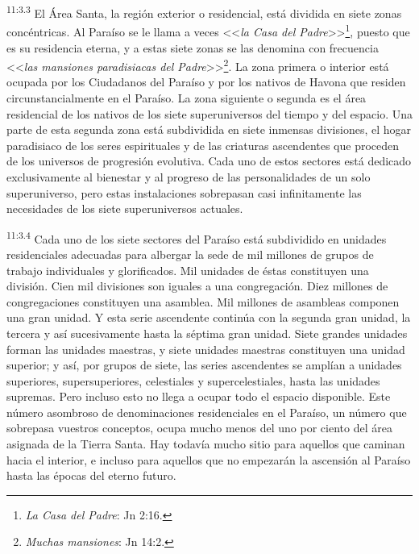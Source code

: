 \par
\textsuperscript{11:3.3} El Área Santa, la región exterior o residencial, está dividida en siete zonas concéntricas. Al Paraíso se le llama a veces <<\textit{la Casa del Padre}>>\footnote{\textit{La Casa del Padre}: Jn 2:16.}, puesto que es su residencia eterna, y a estas siete zonas se las denomina con frecuencia <<\textit{las mansiones paradisiacas del Padre}>>\footnote{\textit{Muchas mansiones}: Jn 14:2.}. La zona primera o interior está ocupada por los Ciudadanos del Paraíso y por los nativos de Havona que residen circunstancialmente en el Paraíso. La zona siguiente o segunda es el área residencial de los nativos de los siete superuniversos del tiempo y del espacio. Una parte de esta segunda zona está subdividida en siete inmensas divisiones, el hogar paradisiaco de los seres espirituales y de las criaturas ascendentes que proceden de los universos de progresión evolutiva. Cada uno de estos sectores está dedicado exclusivamente al bienestar y al progreso de las personalidades de un solo superuniverso, pero estas instalaciones sobrepasan casi infinitamente las necesidades de los siete superuniversos actuales.

\par
\textsuperscript{11:3.4} Cada uno de los siete sectores del Paraíso está subdividido en unidades residenciales adecuadas para albergar la sede de mil millones de grupos de trabajo individuales y glorificados. Mil unidades de éstas constituyen una división. Cien mil divisiones son iguales a una congregación. Diez millones de congregaciones constituyen una asamblea. Mil millones de asambleas componen una gran unidad. Y esta serie ascendente continúa con la segunda gran unidad, la tercera y así sucesivamente hasta la séptima gran unidad. Siete grandes unidades forman las unidades maestras, y siete unidades maestras constituyen una unidad superior; y así, por grupos de siete, las series ascendentes se amplían a unidades superiores, supersuperiores, celestiales y supercelestiales, hasta las unidades supremas. Pero incluso esto no llega a ocupar todo el espacio disponible. Este número asombroso de denominaciones residenciales en el Paraíso, un número que sobrepasa vuestros conceptos, ocupa mucho menos del uno por ciento del área asignada de la Tierra Santa. Hay todavía mucho sitio para aquellos que caminan hacia el interior, e incluso para aquellos que no empezarán la ascensión al Paraíso hasta las épocas del eterno futuro.

